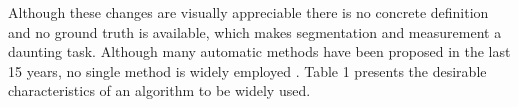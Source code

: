 Although these changes are visually appreciable there is no concrete definition and no ground truth is available, which makes segmentation and measurement a daunting task. Although many automatic methods have been proposed in the last 15 years, no single method is widely employed \cite{23084503}. Table 1 presents the desirable characteristics of an algorithm to be widely used.
    